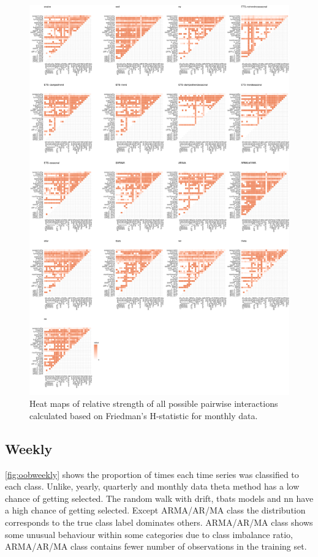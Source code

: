 \documentclass[11pt,a4paper,]{article}
\begin{document}
\begin{figure}
\centering
\includegraphics{figures/friedmanM-1.pdf}
\caption{\label{fig:friedmanM}Heat maps of relative strength of all possible
pairwise interactions calculated based on Friedman's H-statistic for
monthly data.}
\end{figure}

\subsection{Weekly}\label{weekly}

\autoref{fig:oobweekly} shows the proportion of times each time series
was classified to each class. Unlike, yearly, quarterly and monthly data
theta method has a low chance of getting selected. The random walk with
drift, tbats models and nn have a high chance of getting selected.
Except ARMA/AR/MA class the distribution corresponds to the true class
label dominates others. ARMA/AR/MA class shows some unusual behaviour
within some categories due to class imbalance ratio, ARMA/AR/MA class
contains fewer number of observations in the training set.
\end{document}
